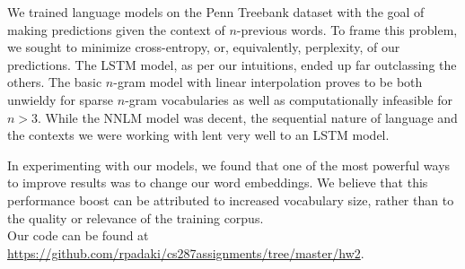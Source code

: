 \documentclass[11pt]{article}
\begin{document}


We trained language models on the Penn Treebank dataset with the goal of making predictions given the context of $n$-previous words. To frame this problem, we sought to minimize cross-entropy, or, equivalently, perplexity, of our predictions. The LSTM model, as per our intuitions, ended up far outclassing the others. The basic $n$-gram model with linear interpolation proves to be both unwieldy for sparse $n$-gram vocabularies as well as computationally infeasible for $n>3$. While the NNLM model was decent, the sequential nature of language and the contexts we were working with lent very well to an LSTM model.

In experimenting with our models, we found that one of the most powerful ways to improve results was to change our word embeddings. We believe that this performance boost can be attributed to increased vocabulary size, rather than to the quality or relevance of the training corpus.
\\

Our code can be found at \url{https://github.com/rpadaki/cs287assignments/tree/master/hw2}.



\end{document}
